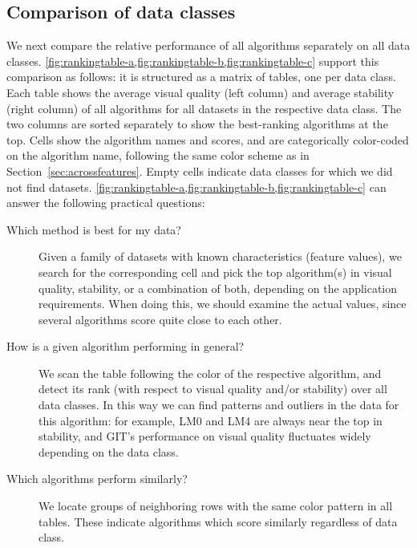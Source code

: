 \subsection{Comparison of data classes}
\label{sec:comparison}
%
We next compare the relative performance of all algorithms separately on all data classes. 
\cref{fig:rankingtable-a,fig:rankingtable-b,fig:rankingtable-c} support this comparison as follows: it is structured as a matrix of tables, one per data class.
Each table shows the average visual quality (left column) and average stability (right column) of all algorithms for all datasets in the respective data class. The two columns are sorted separately to show the best-ranking algorithms at the top. Cells show the algorithm names and scores, and are categorically color-coded on the algorithm name, following the same color scheme as in Section~\ref{sec:acrossfeatures}. Empty cells indicate data classes for which we did not find datasets.
\cref{fig:rankingtable-a,fig:rankingtable-b,fig:rankingtable-c} can answer the following practical questions:
%
\begin{description}
\item[Which method is best for my data?] Given a family of datasets with known characteristics (feature values), we search for the corresponding cell and pick the top algorithm(s) in visual quality, stability, or a combination of both, depending on the application requirements. When doing this, we should examine the actual values, since several algorithms score quite close to each other.
\item[How is a given algorithm performing in general?] We scan the table following the color of the respective algorithm, and detect its rank (with respect to visual quality and/or stability) over all data classes. In this way we can find patterns and outliers in the data for this algorithm: for example, LM0 and LM4 are always near the top in stability, and GIT's performance on visual quality fluctuates widely depending on the data class.
\item[Which algorithms perform similarly?] We locate groups of neigh\-boring rows with the same color pattern in all tables. These indicate algorithms which score similarly regardless of data class.
\end{description}
%

